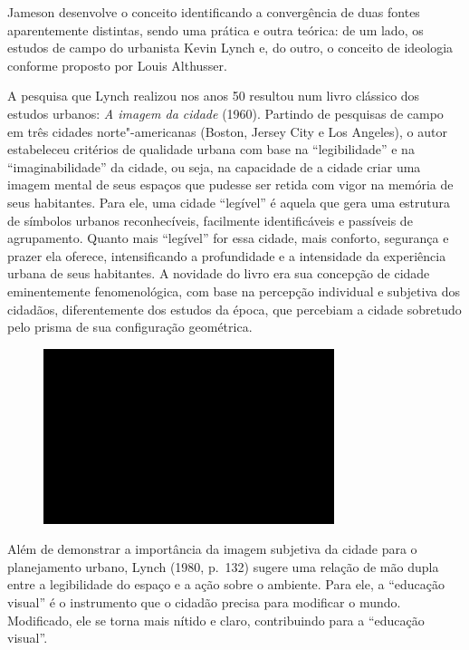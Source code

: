 Jameson desenvolve o conceito identificando a convergência de duas
fontes aparentemente distintas, sendo uma prática e outra teórica: de um
lado, os estudos de campo do urbanista Kevin Lynch e, do outro, o
conceito de ideologia conforme proposto por Louis Althusser.

A pesquisa que Lynch realizou nos anos 50 resultou num livro clássico
dos estudos urbanos: \emph{A imagem da cidade} (1960). Partindo de
pesquisas de campo em três cidades norte"-americanas (Boston, Jersey City
e Los Angeles), o autor estabeleceu critérios de qualidade urbana com
base na ``legibilidade'' e na ``imaginabilidade'' da cidade, ou seja, na
capacidade de a cidade criar uma imagem mental de seus espaços que
pudesse ser retida com vigor na memória de seus habitantes. Para ele,
uma cidade ``legível'' é aquela que gera uma estrutura de símbolos
urbanos reconhecíveis, facilmente identificáveis e passíveis de
agrupamento. Quanto mais ``legível'' for essa cidade, mais conforto,
segurança e prazer ela oferece, intensificando a profundidade e a
intensidade da experiência urbana de seus habitantes. A novidade do
livro era sua concepção de cidade eminentemente fenomenológica, com base
na percepção individual e subjetiva dos cidadãos, diferentemente dos
estudos da época, que percebiam a cidade sobretudo pelo prisma de sua
configuração geométrica.

\begin{figure}[!ht]

\centering
 \includegraphics[width=85mm]{./imgs/im1.jpg}
\caption{\tiny{}}

\end{figure}

Além de demonstrar a importância da imagem subjetiva da cidade para o
planejamento urbano, Lynch (1980, p.~132) sugere uma relação de mão
dupla entre a legibilidade do espaço e a ação sobre o ambiente. Para
ele, a ``educação visual'' é o instrumento que o cidadão precisa para
modificar o mundo. Modificado, ele se torna mais nítido e claro,
contribuindo para a ``educação visual''.

